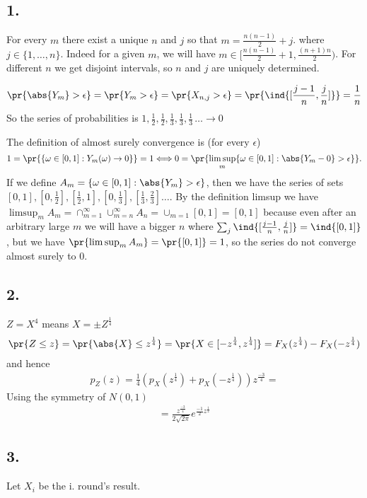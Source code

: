 \subsection*{1.}
For every $m$ there exist a unique $n$ and $j$ so that $m=\frac{n(n-1)}{2}+j$. where $j\in\{1,\ldots,n\}$. Indeed for a given $m$, we will have $m \in[\frac{n(n-1)}{2}+1, \frac{(n+1)n}{2})$. For different $n$ we get disjoint intervals, so $n$ and $j$ are uniquely determined.

\begin{gather*}
    \pr{\abs{Y_m}>\epsilon}=\pr{Y_m>\epsilon}=\pr{X_{n,j}>\epsilon}=\pr{\ind{[\frac{j-1}{n},\frac{j}{n}]}}=\frac{1}{n}
\end{gather*}
So the series of probabilities is $1, \frac{1}{2}, \frac{1}{2}, \frac{1}{3}, \frac{1}{3}, \frac{1}{3}\,\ldots \to 0$

The definition of almost surely convergence is (for every $\epsilon$) $$1=\pr{\{\omega\in[0,1]:Y_m(\omega)\to0\}}=1\Longleftrightarrow0=\pr{\limsup_m\{\omega \in [0,1]: \abs{Y_m-0}>\epsilon\}}.$$ If we define $A_m=\{\omega \in [0,1]: \abs{Y_m}>\epsilon\}$, then we have the series of sets $[0,1], [0,\frac{1}{2}], [\frac{1}{2},1], [0,\frac{1}{3}], [\frac{1}{3},\frac{2}{3}]\ldots$. By the definition limsup we have $\limsup_m A_m=\cap_{m=1}^{\infty} \cup_{m=n}^{\infty}A_n=\cup_{m=1}[0,1]=[0,1]$ because even after an arbitrary large $m$ we will have a bigger $n$ where $\sum_j\ind{[\frac{j-1}{n}, \frac{j}{n}]}=\ind{[0,1]}$, but we have $\pr{\limsup_m A_m}=\pr{[0,1]}=1$, so the series do not converge almost surely to $0$.

\subsection*{2.}
$Z=X^4$ means $X=\pm Z^\frac{1}{4}$
\begin{gather*}
    \pr{Z \le z}=\pr{\abs{X} \le z^\frac{1}{4}}=\pr{X \in [-z^\frac{1}{4},z^\frac{1}{4}]}=F_{X}(z^\frac{1}{4})-F_{X}(-z^\frac{1}{4})
\end{gather*}
and hence
\begin{gather*}
    p_{Z}(z)=\frac{1}{4}(p_{X}(z^\frac{1}{4})+p_{X}(-z^\frac{1}{4}))z^\frac{-3}{4}=
\end{gather*}
Using the symmetry of $N(0,1)$ 
\begin{gather*}
    = \frac{z^{\frac{-3}{4}}}{2\sqrt{2\pi}}e^{\frac{-1}{2}z^{\frac{1}{2}}}
\end{gather*}

\subsection*{3.}
Let $X_i$ be the i. round's result. 

